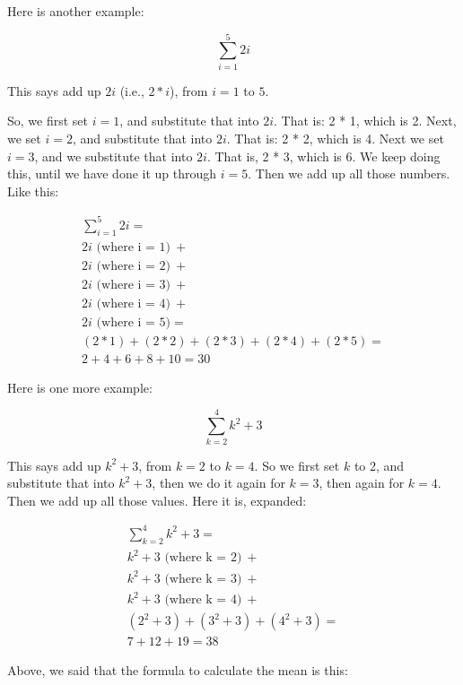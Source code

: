 \documentclass[../../../main.tex]{subfiles}
\begin{document}
\noindent
Here is another example:

\begin{equation*}
  \sum_{i=1}^{5} 2i
\end{equation*}

\noindent
This says add up $2i$ (i.e., $2 * i$), from $i = 1$ to $5$. 

So, we first set $i = 1$, and substitute that into $2i$. That is: 2 * 1, which is 2. Next, we set $i = 2$, and substitute that into $2i$. That is: 2 * 2, which is 4. Next we set $i = 3$, and we substitute that into $2i$. That is, 2 * 3, which is 6. We keep doing this, until we have done it up through $i = 5$. Then we add up all those numbers. Like this:

\begin{multline*}
  \sum_{i=1}^{5} 2i = \\
  2i\text{ (where i = 1)}~+ \\
  2i\text{ (where i = 2)}~+ \\
  2i\text{ (where i = 3)}~+  \\
  2i\text{ (where i = 4)}~+ \\
  2i\text{ (where i = 5)} = \\
  (2 * 1) + (2 * 2) + (2 * 3) + (2 * 4) + (2 * 5) = \\
  2 + 4 + 6 + 8 + 10 = 30
\end{multline*}

\noindent
Here is one more example:

\begin{equation*}
  \sum_{k=2}^{4} k^{2} + 3
\end{equation*}

\noindent
This says add up $k^{2} + 3$, from $k = 2$ to $k = 4$. So we first set $k$ to 2, and substitute that into $k^{2} + 3$, then we do it again for $k = 3$, then again for $k = 4$. Then we add up all those values. Here it is, expanded:

\begin{multline*}
  \sum_{k=2}^{4} k^{2} + 3 = \\
  k^{2} + 3 \text{ (where k = 2)}~+ \\
  k^{2} + 3 \text{ (where k = 3)}~+ \\
  k^{2} + 3 \text{ (where k = 4)}~+  \\
  (2^{2} + 3) + (3^{2} + 3) + (4^{2} + 3) = \\
  7 + 12 + 19 = 38
\end{multline*}

\noindent
Above, we said that the formula to calculate the mean is this:
\end{document}
